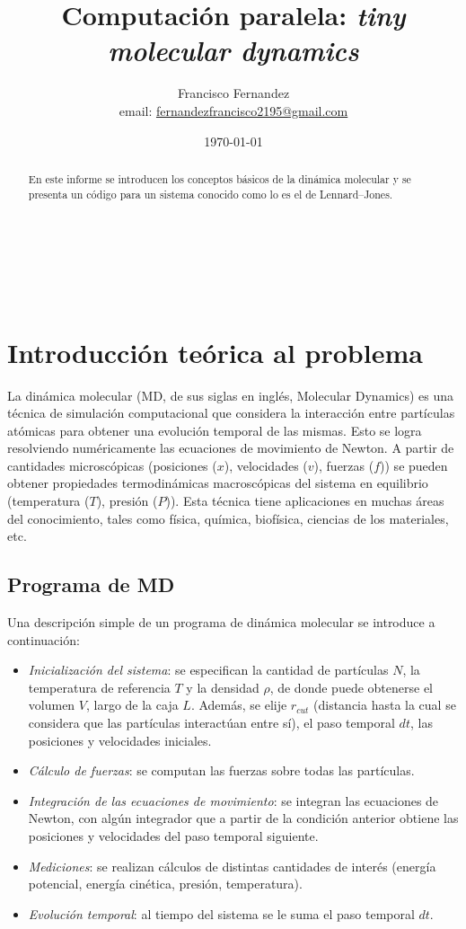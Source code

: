 \documentclass[a4paper,spanish,12pt,twoside]{article}
\title{Computación paralela: \textit{tiny molecular dynamics}}
\author{Francisco Fernandez \\ \small{email: \href{mailto:fernandezfrancisco2195@gmail.com}{fernandezfrancisco2195@gmail.com}}}
\date{\today}
\begin{document}
\maketitle

\

\

\begin{abstract}

En este informe se introducen los conceptos básicos de la dinámica molecular y se presenta un código para un sistema conocido como lo es el de Lennard--Jones. 


\end{abstract}


\section{Introducción teórica al problema}

La dinámica molecular (MD, de sus siglas en inglés, Molecular Dynamics) es una técnica de simulación computacional que considera la interacción entre partículas atómicas para obtener una evolución temporal de las mismas. Esto se logra resolviendo numéricamente las ecuaciones de movimiento de Newton. A partir de cantidades microscópicas (posiciones ($x$), velocidades ($v$), fuerzas ($f$)) se pueden obtener propiedades termodinámicas macroscópicas del sistema en equilibrio (temperatura ($T$), presión ($P$)). Esta técnica tiene aplicaciones en muchas áreas del conocimiento, tales como física, química, biofísica, ciencias de los materiales, etc.

\subsection{Programa de MD}

Una descripción simple de un programa de dinámica molecular se introduce a continuación:

\begin{itemize}
 \item \textit{Inicialización del sistema}: se especifican la cantidad de partículas $N$, la temperatura de referencia $T$ y la densidad $\rho$, de donde puede obtenerse el volumen $V$, largo de la caja $L$. Además, se elije $r_{cut}$ (distancia hasta la cual se considera que las partículas interactúan entre sí), el paso temporal $dt$, las posiciones y velocidades iniciales.
 \item \textit{Cálculo de fuerzas}: se computan las fuerzas sobre todas las partículas.
 \item \textit{Integración de las ecuaciones de movimiento}: se integran las ecuaciones de Newton, con algún integrador que a partir de la condición anterior obtiene las posiciones y velocidades del paso temporal siguiente.
 \item \textit{Mediciones}: se realizan cálculos de distintas cantidades de interés (energía potencial, energía cinética, presión, temperatura).
 \item \textit{Evolución temporal}: al tiempo del sistema se le suma el paso temporal $dt$.
\end{itemize}
\end{document}
